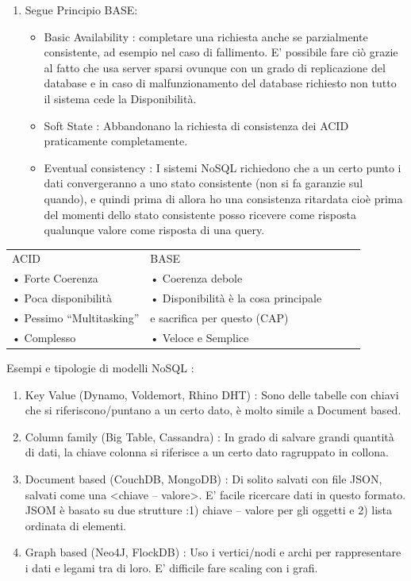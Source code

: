 \documentclass[a4page, 11pt]{article}
\begin{document}
\begin{enumerate}[noitemsep]
	\item
	Segue Principio BASE:
	\begin{itemize}
		
		\item
		Basic Availability : completare una richiesta anche se parzialmente
		consistente, ad esempio nel caso di fallimento. E' possibile fare ciò
		grazie al fatto che usa server sparsi ovunque con un grado di
		replicazione del database e in caso di malfunzionamento del database
		richiesto non tutto il sistema cede la Disponibilità.
		\item
		Soft State : Abbandonano la richiesta di consistenza dei ACID
		praticamente completamente.
		\item
		Eventual consistency : I sistemi NoSQL richiedono che a un certo punto
		i dati convergeranno a uno stato consistente (non si fa garanzie sul
		quando), e quindi prima di allora ho una consistenza ritardata cioè
		prima del momenti dello stato consistente posso ricevere come risposta
		qualunque valore come risposta di una query.
	\end{itemize}
\end{enumerate}



\begin{center}
\begin{tabular}{lllll}
ACID & BASE \\
• Forte Coerenza & • Coerenza debole\\
• Poca disponibilità & \multicolumn{1}{r}{• Disponibilità è la cosa principale}\\
• Pessimo “Multitasking” & e sacrifica per questo (CAP)\\
• Complesso & • Veloce e Semplice\\

\end{tabular}
\end{center}

Esempi e tipologie di modelli NoSQL :

\begin{enumerate}[noitemsep]
	 
	\item
	Key Value (Dynamo, Voldemort, Rhino DHT) : Sono delle tabelle con
	chiavi che si riferiscono/puntano a un certo dato, è molto simile a
	Document based. 
	\item
	Column family (Big Table, Cassandra) : In grado di salvare grandi
	quantità di dati, la chiave colonna si riferisce a un certo dato
	ragruppato in collona.
	\item
	Document based (CouchDB, MongoDB) : Di solito salvati con file JSON,
	salvati come una \textless{}chiave -- valore\textgreater{}. E' facile
	ricercare dati in questo formato. JSOM è basato su due strutture :1)
	chiave -- valore per gli oggetti e 2) lista ordinata di elementi.
	\item
	Graph based (Neo4J, FlockDB) : Uso i vertici/nodi e archi per
	rappresentare i dati e legami tra di loro. E' difficile fare scaling
	con i grafi.
\end{enumerate}
\end{document}
